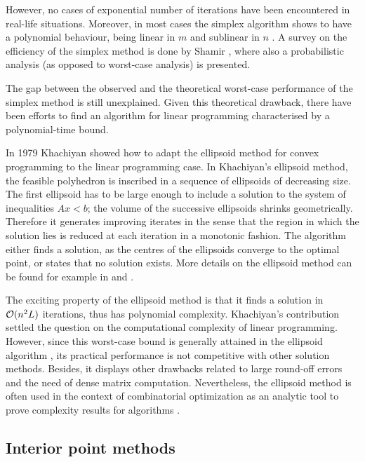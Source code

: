 However, no cases of exponential number of iterations have been encountered 
in real-life situations. Moreover, in most cases the simplex algorithm shows 
to have a polynomial behaviour, being linear in $m$ and sublinear in $n$
\cite[p.94]{FangPuthenpura93}.
A survey on the efficiency of the simplex method is done by Shamir 
\cite{Shamir87}, where also a probabilistic analysis (as opposed to
worst-case analysis) is presented.

The gap between the observed and the theoretical worst-case performance
of the simplex method is still unexplained.
Given this theoretical drawback, there have been efforts to find an
algorithm for linear programming characterised by a polynomial-time bound.

In 1979 Khachiyan showed how to adapt the ellipsoid method for convex
programming to the linear programming case.
In Khachiyan's ellipsoid method, the feasible polyhedron is inscribed in 
a sequence of ellipsoids of decreasing size. 
The first ellipsoid has to be large enough to include a solution to the
system of inequalities $Ax < b$; the volume of the successive ellipsoids 
shrinks geometrically. Therefore it generates improving iterates
in the sense that the region in which the solution lies is 
reduced at each iteration in a monotonic fashion.
The algorithm either finds a solution, as the centres of the ellipsoids
converge to the optimal point, or states that no solution exists.
More details on the ellipsoid method can be found for example in 
\cite[ch.~13]{Schrijver86} and \cite[ch.~I.6]{ip:NemhauserWolsey88}.

The exciting property of the ellipsoid method is that it finds a 
solution in $\mathcal{O}(n^2L)$ iterations, thus has polynomial complexity. 
Khachiyan's contribution settled the question on the computational 
complexity of linear programming.
However, since this worst-case bound
is generally attained in the ellipsoid algorithm \cite{GoldfarbTodd82},
its practical performance is not competitive
with other solution methods. Besides, it displays other drawbacks
related to large round-off errors and the need of dense matrix computation.
Nevertheless, the ellipsoid method is often used in the context of
combinatorial optimization as an analytic tool to prove complexity
results for algorithms \cite{ip:NemhauserWolsey88}.

%
%
\subsection{Interior point methods}

